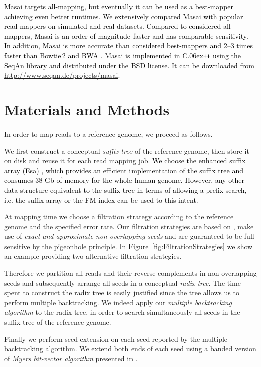 \documentclass[a4,center,fleqn]{article}
\newcommand{\ie}{{i.e.}\xspace}
\newcommand{\CC}{C\raise.06ex\hbox{\tt ++}\xspace}
\begin{document}
\textcolor{black}
{
Masai targets all-mapping, but eventually it can be used as a best-mapper achieving even better runtimes.
We extensively compared Masai with popular read mappers on simulated and real datasets.
Compared to considered all-mappers, Masai is an order of magnitude faster and has comparable sensitivity.
In addition, Masai is more accurate than considered best-mappers and 2--3 times faster than Bowtie\,2 and \cite{Bowtie2} BWA \cite{BWA}.
Masai is implemented in \CC using the SeqAn library and distributed under the BSD license.
It can be downloaded from \url{http://www.seqan.de/projects/masai}.}



\section{Materials and Methods}

In order to map reads to a reference genome, we proceed as follows.

We first construct a conceptual \emph{suffix tree} of the reference genome, then store it on disk and reuse it for each read mapping job.
\textcolor{black}{
We choose the enhanced suffix array (Esa) \cite{Abouelhoda2004}, which provides an efficient implementation of the suffix tree and consumes 38 Gb of memory for the whole human genome.
However, any other data structure equivalent to the suffix tree in terms of allowing a prefix search, \ie the suffix array \cite{Manber1990} or the FM-index \cite{Ferragina2001} can be used to this intent.}

At mapping time we choose a filtration strategy according to the reference genome and the specified error rate.
Our filtration strategies are based on \cite{Navarro2000}, make use of \emph{exact \textcolor{black}{and} approximate non-overlapping seeds} and are guaranteed to be full-sensitive by the pigeonhole principle.
In Figure~\ref{fig:FiltrationStrategies} we show an example providing two alternative filtration strategies.

Therefore we partition all reads and their reverse complements in non-overlapping seeds and subsequently arrange all seeds in a conceptual \emph{radix tree}.
The time spent to construct the radix tree is easily justified since the tree allows us to perform multiple backtracking.
We indeed apply our \emph{multiple backtracking algorithm} to the radix tree, in order to search simultaneously all seeds in the suffix tree of the reference genome.

Finally we perform seed extension on each seed reported by the multiple backtracking algorithm.
We extend both ends of each seed using a banded version of \emph{Myers bit-vector algorithm} \cite{Myers1999} presented in \cite{Razers3}.
\end{document}
